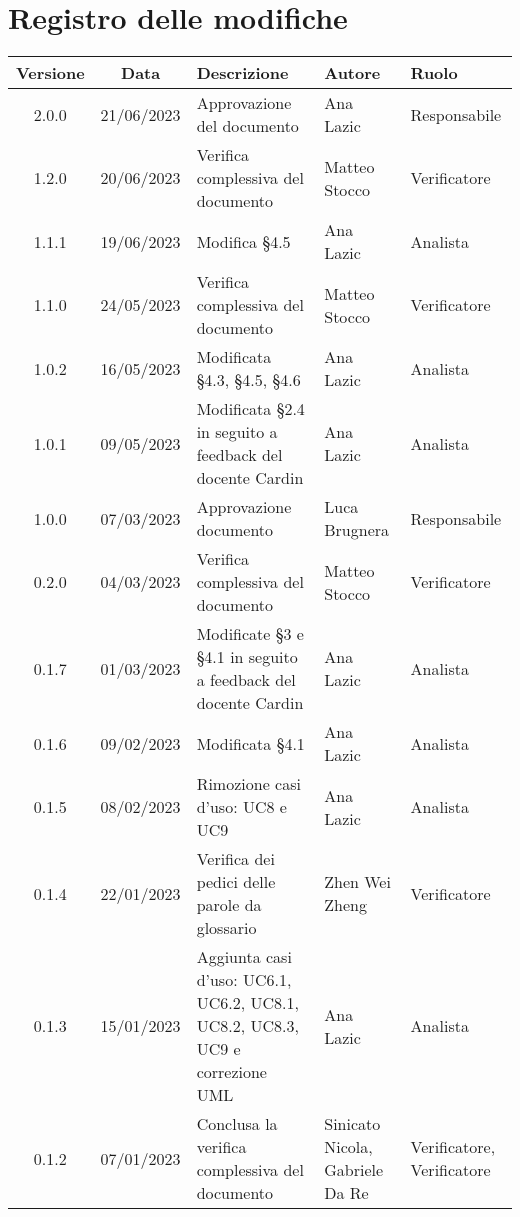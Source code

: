 \section*{Registro delle modifiche}
\begin{center}
\setlength\extrarowheight{5pt}
\renewcommand\tabularxcolumn[1]{>{\Centering}m{#1}}
\begin{tabularx}{\textwidth}{| c | c | X | X | X |} 
	\hline
	\rowcolor{white}
	\textbf{Versione} & \textbf{Data} & \textbf{Descrizione} & \textbf{Autore} & \textbf{Ruolo}\\
	\hline
	2.0.0 & 21/06/2023 & Approvazione del documento & Ana Lazic & Responsabile\\
	\hline
	1.2.0 & 20/06/2023 & Verifica complessiva del documento & Matteo Stocco & Verificatore\\
	\hline
	1.1.1 & 19/06/2023 & Modifica §4.5 & Ana Lazic & Analista\\
 	\hline
	1.1.0 & 24/05/2023 & Verifica complessiva del documento & Matteo Stocco & Verificatore \\
 	\hline
	1.0.2 & 16/05/2023 & Modificata §4.3, §4.5, §4.6 & Ana Lazic & Analista\\
    \hline
	1.0.1 & 09/05/2023 & Modificata §2.4 in seguito a feedback del docente Cardin  & Ana Lazic & Analista\\
	\hline
	1.0.0 & 07/03/2023 & Approvazione documento & Luca Brugnera & Responsabile\\
	\hline
	0.2.0 & 04/03/2023 & Verifica complessiva del documento & Matteo Stocco & Verificatore \\
 	\hline
	0.1.7 & 01/03/2023 & Modificate §3 e §4.1 in seguito a feedback del docente Cardin & Ana Lazic & Analista \\
	\hline
	0.1.6 & 09/02/2023 & Modificata §4.1 & Ana Lazic & Analista \\
 	\hline
	0.1.5 & 08/02/2023 & Rimozione casi d'uso: UC8 e UC9 & Ana Lazic & Analista \\
	\hline
	0.1.4 & 22/01/2023 & Verifica dei pedici delle parole da glossario & Zhen Wei Zheng & Verificatore \\
    	\hline
   	 0.1.3 & 15/01/2023 & Aggiunta casi d'uso: UC6.1, UC6.2, UC8.1, UC8.2, UC8.3, UC9 e correzione UML & Ana Lazic & Analista \\
	\hline
	0.1.2 & 07/01/2023 & Conclusa la verifica complessiva del documento & Sinicato Nicola, Gabriele Da Re & Verificatore, Verificatore \\
	\hline

\end{tabularx}
\end{center}
